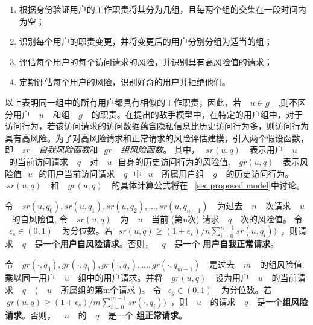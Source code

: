 \begin{enumerate}
	\item 根据身份验证用户的工作职责将其分为几组，且每两个组的交集在一段时间内为空；
	\item 识别每个用户的职责变更，并将变更后的用户分别分组为适当的组；
	\item 评估每个用户的每个访问请求的风险，并识别具有高风险值的请求；
	\item 定期评估每个用户的风险，识别好奇的用户并拒绝他们。
\end{enumerate}

以上表明同一组中的所有用户都具有相似的工作职责，因此，若 ~$~u \in g~$~ ,则不区分用户 ~$~u~$~ 和组 ~$~g~$~ 的职责。在提出的敌手模型中，在特定的用户组中，对于访问行为，若该访问请求的访问数据蕴含隐私信息比历史访问行为多，则访问行为具有高风险。为了对高风险请求和正常请求的风险评估建模，引入两个假设函数，即 ~$~sr~$~ \emph{自我风险函数}和~$~gr~$~ \emph{组风险函数}。 其中，~$~sr(u,q)~$~ 表示用户 ~$~u~$~的当前访问请求 ~$~q~$~ 对 ~$~u~$~自身的历史访问行为的风险值,  ~$~gr(u,q)~$~ 表示风险值~$~u~$~的用户当前访问请求 ~$~q~$~中~$~u~$~ 所属用户组 ~$~g~$~ 的历史访问行为。~$~sr(u,q)~$~ 和 ~$~gr(u,q)~$~ 的具体计算公式将在 ~\ref{sec:proposed model}中讨论。

\begin{definition}%
	\label{def_self_risky}
	令 ~$~sr(u, q_0), sr(u, q_1), sr(u, q_2), ... ,sr(u, q_{n-1})~$~ 为过去 ~$~n~$~ 次请求 ~$~u~$~ 的自风险值, 令 ~$~sr(u,q)~$~ 为 ~$~u~$~ 当前 (第n次) 请求 ~$~q~$~ 次的风险值。 令 ~$\epsilon_s \in (0,1)~$~ 为分位数。若~$~sr(u,q) \geq  (1+\epsilon_s) / n  \sum ^{n-1}_{i=0}{sr(u,q_i))}$~，则请求 ~$~q~$~ 是一个\textbf{用户自风险请求}。否则， ~$~q~$~ 是一个 \textbf{用户自我正常请求}。
\end{definition}

\begin{definition}%
	\label{def_group_risky}
	令 ~$~gr(\cdot, q_0), gr(\cdot, q_1), gr(\cdot, q_2), ... , gr(\cdot, q_{m-1})~$~ 是过去 ~$~m~$~ 的组风险值乘以同一用户 ~$~u~$~ 组中的用户请求。并将 ~$~gr(u,q)~$~ 设为用户 ~$~u~$~ 的当前请求 ~$~q~$~  ( ~$~u~$~ 所属组的第m个请求 )。 令 ~$\epsilon_g \in (0,1)~$~ 为分位数。若~$~gr(u,q) \geq  (1+\epsilon_s) / m  \sum ^{m-1}_{i=0}{sr(\cdot,q_i))}$~，则 ~$~u~$~ 的请求 ~$~q~$~ 是一个\textbf{组风险请求}。否则， ~$~u~$~ 的 ~$~q~$~ 是一个 \textbf{组正常请求}。
\end{definition}


